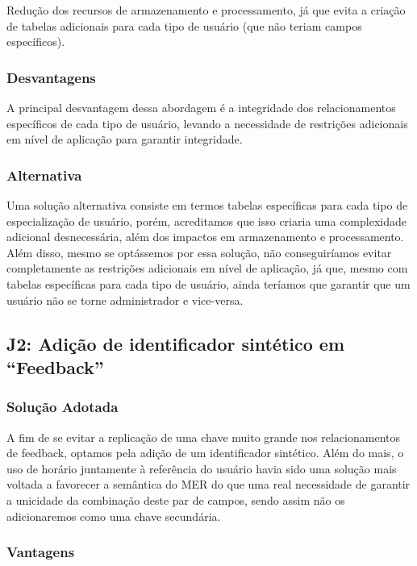Redução dos recursos de armazenamento e processamento, já que evita a criação
de tabelas adicionais para cada tipo de usuário (que não teriam campos
específicos).

\subsubsection{Desvantagens}

A principal desvantagem dessa abordagem é a integridade dos relacionamentos
específicos de cada tipo de usuário, levando a necessidade de restrições
adicionais em nível de aplicação para garantir integridade.

\subsubsection{Alternativa}

Uma solução alternativa consiste em termos tabelas específicas para cada tipo
de especialização de usuário, porém, acreditamos que isso criaria uma
complexidade adicional desnecessária, além dos impactos em armazenamento e
processamento. Além disso, mesmo se optássemos por essa solução, não
conseguiríamos evitar completamente as restrições adicionais em nível de
aplicação, já que, mesmo com tabelas específicas para cada tipo de usuário,
ainda teríamos que garantir que um usuário não se torne administrador e
vice-versa.

\subsection{\textbf{J2:} Adição de identificador sintético em ``Feedback''}

\subsubsection{Solução Adotada}

A fim de se evitar a replicação de uma chave muito grande nos relacionamentos
de feedback, optamos pela adição de um identificador sintético. Além do mais, o
uso de horário juntamente à referência do usuário havia sido uma solução mais
voltada a favorecer a semântica do MER do que uma real necessidade de garantir
a unicidade da combinação deste par de campos, sendo assim não os adicionaremos
como uma chave secundária.

\subsubsection{Vantagens}

